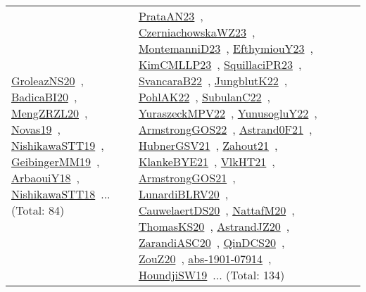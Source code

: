 {\begin{longtable}{lp{3cm}>{\raggedright\arraybackslash}p{6cm}>{\raggedright\arraybackslash}p{6cm}>{\raggedright\arraybackslash}p{8cm}}
\href{works/GroleazNS20.pdf}{GroleazNS20}~\cite{GroleazNS20}, \href{works/BadicaBI20.pdf}{BadicaBI20}~\cite{BadicaBI20}, \href{works/MengZRZL20.pdf}{MengZRZL20}~\cite{MengZRZL20}, \href{works/Novas19.pdf}{Novas19}~\cite{Novas19}, \href{works/NishikawaSTT19.pdf}{NishikawaSTT19}~\cite{NishikawaSTT19}, \href{works/GeibingerMM19.pdf}{GeibingerMM19}~\cite{GeibingerMM19}, \href{works/ArbaouiY18.pdf}{ArbaouiY18}~\cite{ArbaouiY18}, \href{works/NishikawaSTT18.pdf}{NishikawaSTT18}~\cite{NishikawaSTT18}... (Total: 84) & \href{works/PrataAN23.pdf}{PrataAN23}~\cite{PrataAN23}, \href{works/CzerniachowskaWZ23.pdf}{CzerniachowskaWZ23}~\cite{CzerniachowskaWZ23}, \href{works/MontemanniD23.pdf}{MontemanniD23}~\cite{MontemanniD23}, \href{works/EfthymiouY23.pdf}{EfthymiouY23}~\cite{EfthymiouY23}, \href{works/KimCMLLP23.pdf}{KimCMLLP23}~\cite{KimCMLLP23}, \href{works/SquillaciPR23.pdf}{SquillaciPR23}~\cite{SquillaciPR23}, \href{works/SvancaraB22.pdf}{SvancaraB22}~\cite{SvancaraB22}, \href{works/JungblutK22.pdf}{JungblutK22}~\cite{JungblutK22}, \href{works/PohlAK22.pdf}{PohlAK22}~\cite{PohlAK22}, \href{works/SubulanC22.pdf}{SubulanC22}~\cite{SubulanC22}, \href{works/YuraszeckMPV22.pdf}{YuraszeckMPV22}~\cite{YuraszeckMPV22}, \href{works/YunusogluY22.pdf}{YunusogluY22}~\cite{YunusogluY22}, \href{works/ArmstrongGOS22.pdf}{ArmstrongGOS22}~\cite{ArmstrongGOS22}, \href{works/Astrand0F21.pdf}{Astrand0F21}~\cite{Astrand0F21}, \href{works/HubnerGSV21.pdf}{HubnerGSV21}~\cite{HubnerGSV21}, \href{works/Zahout21.pdf}{Zahout21}~\cite{Zahout21}, \href{works/KlankeBYE21.pdf}{KlankeBYE21}~\cite{KlankeBYE21}, \href{works/VlkHT21.pdf}{VlkHT21}~\cite{VlkHT21}, \href{works/ArmstrongGOS21.pdf}{ArmstrongGOS21}~\cite{ArmstrongGOS21}, \href{works/LunardiBLRV20.pdf}{LunardiBLRV20}~\cite{LunardiBLRV20}, \href{works/CauwelaertDS20.pdf}{CauwelaertDS20}~\cite{CauwelaertDS20}, \href{works/NattafM20.pdf}{NattafM20}~\cite{NattafM20}, \href{works/ThomasKS20.pdf}{ThomasKS20}~\cite{ThomasKS20}, \href{works/AstrandJZ20.pdf}{AstrandJZ20}~\cite{AstrandJZ20}, \href{works/ZarandiASC20.pdf}{ZarandiASC20}~\cite{ZarandiASC20}, \href{works/QinDCS20.pdf}{QinDCS20}~\cite{QinDCS20}, \href{works/ZouZ20.pdf}{ZouZ20}~\cite{ZouZ20}, \href{works/abs-1901-07914.pdf}{abs-1901-07914}~\cite{abs-1901-07914}, \href{works/HoundjiSW19.pdf}{HoundjiSW19}~\cite{HoundjiSW19}... (Total: 134)\\

\end{longtable}}
